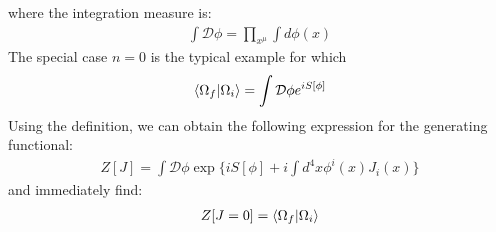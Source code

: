 where the integration measure is:
\begin{align}
    \int \mathcal{D} \phi = \prod_{x^{\mu}} \int d\phi(x)
\end{align}
The special case $n=0$ is the typical example for which
\begin{align}
    \braket{\Omega _{f}}{\Omega _{i}} = \int \mathcal{D} \phi e^{iS[\phi]}
\end{align}
Using the definition, we can obtain the following expression for the generating functional:
\begin{align}
    Z[J] = \int \mathcal{D} \phi \exp\lbrace iS[\phi] + i \int d^{4}x \phi^{i} (x) J_{i} (x) \rbrace
\end{align}
and immediately find:
\begin{align}
    Z[J=0] = \braket{\Omega _{f}}{\Omega _{i}}
\end{align}

